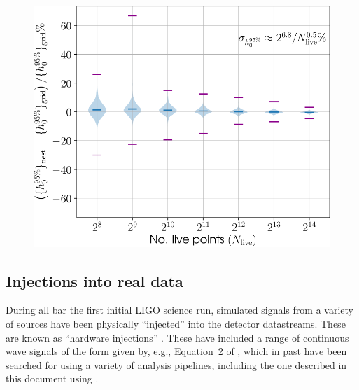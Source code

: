 \begin{figure}[!phtb]
\begin{center}
\includegraphics[width=1\columnwidth]{./figures/codeeval/stats/uls/uls}
\caption{ \protect}
\end{center}
\end{figure}

\subsection{Injections into real data}

During all bar the first initial LIGO science run, simulated signals from a variety of sources have been physically ``injected'' into the detector
datastreams. These are known as ``hardware injections'' \citep[see][for a general discussion of hardware injections, in particular relating to their
use, and extraction, in advanced LIGO's first obersving run]{2016arXiv161207864B}. These have included a range of continuous wave signals of the form given
by, e.g., Equation~2 of \citet{2017arXiv170107709T}, which in past have been searched for using a variety of analysis pipelines, including the one
described in this document using \lppe \citep[see, e.g., Appendix~B of][]{2007PhRvD..76d2001A}.

